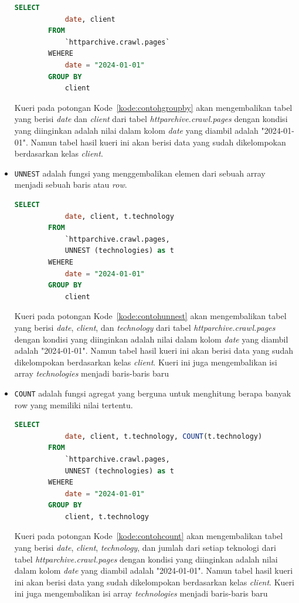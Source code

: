 \begin{itemize}
\begin{lstlisting}[language=SQL, caption=contoh penggunaan sintaks \lstinline|GROUP BY|, label=kode:contohgroupby]
        SELECT
            date, client
        FROM
            `httparchive.crawl.pages`
        WEHERE
            date = "2024-01-01"
        GROUP BY
            client
    \end{lstlisting}
     Kueri pada potongan Kode~\ref{kode:contohgroupby} akan mengembalikan tabel yang berisi \textit{date} dan \textit{client} dari tabel \textit{httparchive.crawl.pages} dengan kondisi yang diinginkan adalah nilai dalam kolom \textit{date} yang diambil adalah "2024-01-01". Namun tabel hasil kueri ini akan berisi data yang sudah dikelompokan berdasarkan kelas \textit{client}.
    \item \verb|UNNEST| adalah fungsi yang menggembalikan elemen dari sebuah array menjadi sebuah baris atau \textit{row}.
      \begin{lstlisting}[language=SQL, caption=contoh penggunaan sintaks \lstinline|UNNEST|, label=kode:contohunnest]
        SELECT
            date, client, t.technology
        FROM
            `httparchive.crawl.pages,
            UNNEST (technologies) as t
        WEHERE
            date = "2024-01-01"
        GROUP BY
            client
    \end{lstlisting}
     Kueri pada potongan Kode~\ref{kode:contohunnest} akan mengembalikan tabel yang berisi \textit{date}, \textit{client}, dan \textit{technology} dari tabel \textit{httparchive.crawl.pages} dengan kondisi yang diinginkan adalah nilai dalam kolom \textit{date} yang diambil adalah "2024-01-01". Namun tabel hasil kueri ini akan berisi data yang sudah dikelompokan berdasarkan kelas \textit{client}. Kueri ini juga mengembalikan isi array \textit{technologies} menjadi baris-baris baru
    \item \verb|COUNT| adalah fungsi agregat yang berguna untuk menghitung berapa banyak row yang memiliki nilai tertentu.
    \begin{lstlisting}[language=SQL, caption=contoh penggunaan sintaks \lstinline|COUNT|, label=kode:contohcount]
        SELECT
            date, client, t.technology, COUNT(t.technology)
        FROM
            `httparchive.crawl.pages,
            UNNEST (technologies) as t
        WEHERE
            date = "2024-01-01"
        GROUP BY
            client, t.technology
    \end{lstlisting}
     Kueri pada potongan Kode~\ref{kode:contohcount} akan mengembalikan tabel yang berisi \textit{date}, \textit{client}, \textit{technology}, dan jumlah dari setiap teknologi dari tabel \textit{httparchive.crawl.pages} dengan kondisi yang diinginkan adalah nilai dalam kolom \textit{date} yang diambil adalah "2024-01-01". Namun tabel hasil kueri ini akan berisi data yang sudah dikelompokan berdasarkan kelas \textit{client}. Kueri ini juga mengembalikan isi array \textit{technologies} menjadi baris-baris baru

\end{itemize}
